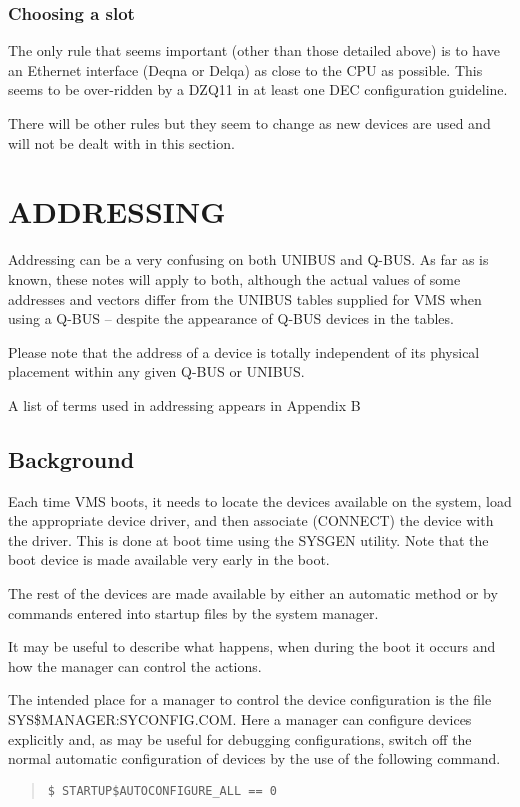 \subsubsection{Choosing a slot}

The only rule that seems important (other than those detailed above)
 is to have an Ethernet interface (Deqna or Delqa) as close to the CPU
as possible.
This seems to be over-ridden by a DZQ11 in at least one DEC configuration
guideline.

There will be other rules but they seem to change as new devices are used 
and will not be dealt with in this section.

\section{ADDRESSING}

Addressing can be a very confusing on both UNIBUS and Q-BUS.
As far as is known, these notes will apply to both, although the actual values 
of some addresses and vectors differ from the UNIBUS tables supplied for 
VMS when using a Q-BUS -- despite the appearance of Q-BUS devices in the 
tables.

Please note that the address of a device is totally independent of its
physical placement within any given Q-BUS or UNIBUS.

A list of terms used in addressing appears in Appendix B

\subsection{Background}

Each time VMS boots, it needs to locate the devices available on the system,
load the appropriate device driver, and then associate (CONNECT) the device
with the driver.
This is done at boot time using the SYSGEN utility.
Note that the boot device is made available very early in the boot.

The rest of the devices are made available by either an automatic method
or by commands entered into startup files by the system manager.

It may be useful to describe what happens, when during the boot it occurs
and how the manager can control the actions.

\begin{sloppypar}
The intended place for a manager to control the device configuration is the 
file SYS\$MANAGER:SYCONFIG.COM.
Here a manager can configure devices explicitly and, as may be useful for
debugging configurations, switch off the normal automatic configuration
of devices by the use of the following command.
\end{sloppypar}
\begin{quote}
\begin{verbatim}
$ STARTUP$AUTOCONFIGURE_ALL == 0
\end{verbatim}
\end{quote}

